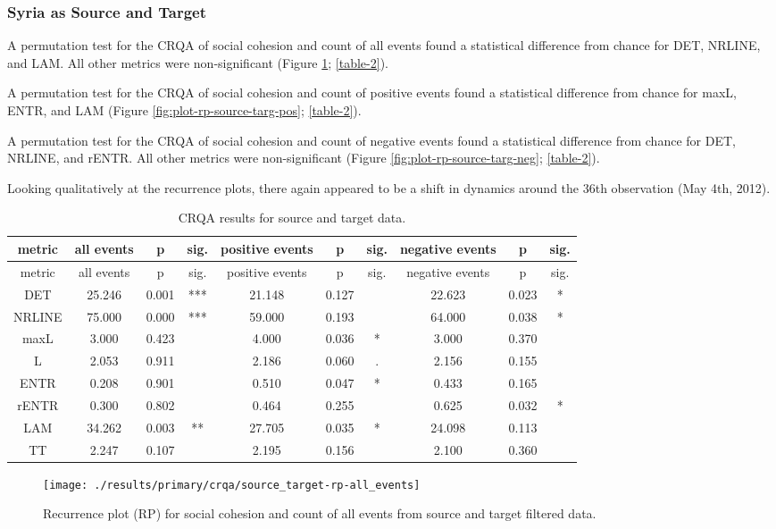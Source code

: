 \documentclass[english,man]{apa6}
\begin{document}
\hypertarget{syria-as-source-and-target}{%
\subsubsection{Syria as Source and Target}\label{syria-as-source-and-target}}

A permutation test for the CRQA of social cohesion and count of all
events found a statistical difference from chance for DET, NRLINE, and
LAM. All other metrics were non-significant (Figure
\ref{fig:plot-rp-source-targ-all}; \autoref{table-2}).

A permutation test for the CRQA of social cohesion and count of positive
events found a statistical difference from chance for maxL, ENTR, and LAM
(Figure \ref{fig:plot-rp-source-targ-pos}; \autoref{table-2}).

A permutation test for the CRQA of social cohesion and count of negative
events found a statistical difference from chance for DET, NRLINE, and rENTR.
All other metrics were non-significant (Figure
\ref{fig:plot-rp-source-targ-neg}; \autoref{table-2}).

Looking qualitatively at the recurrence plots, there again appeared
to be a shift in dynamics around the 36th observation (May 4th, 2012).

\begin{longtable}[]{@{}cccccccccc@{}}
\caption{\label{table-2}CRQA results for source and target data.}\tabularnewline
\toprule
metric & all events & p & sig. & positive events & p & sig. & negative events & p & sig.\tabularnewline
\midrule
\endfirsthead
\toprule
metric & all events & p & sig. & positive events & p & sig. & negative events & p & sig.\tabularnewline
\midrule
\endhead
DET & 25.246 & 0.001 & *** & 21.148 & 0.127 & & 22.623 & 0.023 & *\tabularnewline
NRLINE & 75.000 & 0.000 & *** & 59.000 & 0.193 & & 64.000 & 0.038 & *\tabularnewline
maxL & 3.000 & 0.423 & & 4.000 & 0.036 & * & 3.000 & 0.370 &\tabularnewline
L & 2.053 & 0.911 & & 2.186 & 0.060 & . & 2.156 & 0.155 &\tabularnewline
ENTR & 0.208 & 0.901 & & 0.510 & 0.047 & * & 0.433 & 0.165 &\tabularnewline
rENTR & 0.300 & 0.802 & & 0.464 & 0.255 & & 0.625 & 0.032 & *\tabularnewline
LAM & 34.262 & 0.003 & ** & 27.705 & 0.035 & * & 24.098 & 0.113 &\tabularnewline
TT & 2.247 & 0.107 & & 2.195 & 0.156 & & 2.100 & 0.360 &\tabularnewline
\bottomrule
\end{longtable}

\begin{figure}
\texttt{[image: ./results/primary/crqa/source\_target-rp-all\_events]} \caption{Recurrence plot (RP) for social cohesion and count of all events from source and target filtered data.}\label{fig:plot-rp-source-targ-all}
\end{figure}
\end{document}
